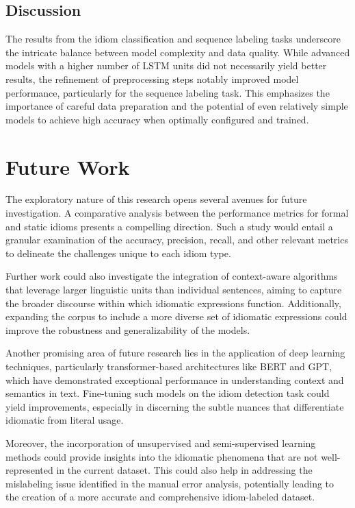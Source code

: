 \documentclass[conference]{IEEEtran}
\begin{document}
\subsection{Discussion}
The results from the idiom classification and sequence labeling tasks underscore the intricate balance between model complexity and data quality. While advanced models with a higher number of LSTM units did not necessarily yield better results, the refinement of preprocessing steps notably improved model performance, particularly for the sequence labeling task. This emphasizes the importance of careful data preparation and the potential of even relatively simple models to achieve high accuracy when optimally configured and trained.

\section{Future Work}

The exploratory nature of this research opens several avenues for future investigation. A comparative analysis between the performance metrics for formal and static idioms presents a compelling direction. Such a study would entail a granular examination of the accuracy, precision, recall, and other relevant metrics to delineate the challenges unique to each idiom type.

Further work could also investigate the integration of context-aware algorithms that leverage larger linguistic units than individual sentences, aiming to capture the broader discourse within which idiomatic expressions function. Additionally, expanding the corpus to include a more diverse set of idiomatic expressions could improve the robustness and generalizability of the models.

Another promising area of future research lies in the application of deep learning techniques, particularly transformer-based architectures like BERT and GPT, which have demonstrated exceptional performance in understanding context and semantics in text. Fine-tuning such models on the idiom detection task could yield improvements, especially in discerning the subtle nuances that differentiate idiomatic from literal usage.

Moreover, the incorporation of unsupervised and semi-supervised learning methods could provide insights into the idiomatic phenomena that are not well-represented in the current dataset. This could also help in addressing the mislabeling issue identified in the manual error analysis, potentially leading to the creation of a more accurate and comprehensive idiom-labeled dataset.
\end{document}
